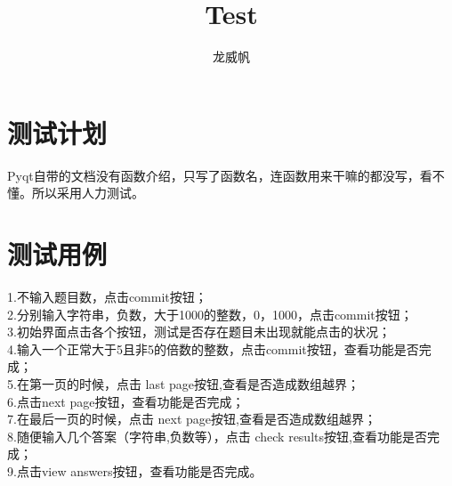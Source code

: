 \documentclass[10pt,journal,compsoc,fleqn]{IEEEtran}
\begin{document}
\begin{CJK}{UTF8}{song}
\title{Test}
\author{龙威帆}
\maketitle


\section{测试计划}
Pyqt自带的文档没有函数介绍，只写了函数名，连函数用来干嘛的都没写，看不懂。所以采用人力测试。

\section{测试用例}
1.不输入题目数，点击commit按钮；\\
2.分别输入字符串，负数，大于1000的整数，0，1000，点击commit按钮；\\
3.初始界面点击各个按钮，测试是否存在题目未出现就能点击的状况；\\
4.输入一个正常大于5且非5的倍数的整数，点击commit按钮，查看功能是否完成；\\
5.在第一页的时候，点击 last page按钮,查看是否造成数组越界；\\
6.点击next page按钮，查看功能是否完成；\\
7.在最后一页的时候，点击 next page按钮,查看是否造成数组越界；\\
8.随便输入几个答案（字符串,负数等），点击 check results按钮,查看功能是否完成；\\
9.点击view answers按钮，查看功能是否完成。

\end{CJK}
\end{document}
